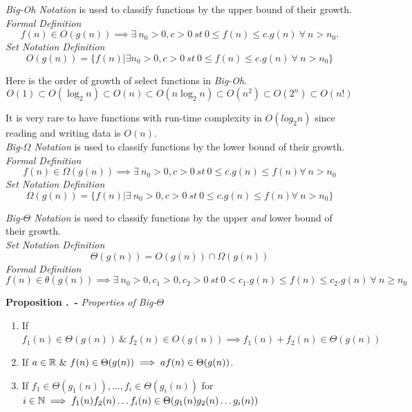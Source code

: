 \documentclass[11pt,a4paper]{article}
\begin{document}
\textit{Big-Oh Notation} is  used to classify functions by the upper bound of their growth.\\
\textit{Formal Definition}
$$f(n) \in O(g(n)) \implies \exists\ n_0 > 0, c>0\ st\ 0\leq f(n) \leq c.g(n)\ \forall\ n>n_0.$$
\textit{Set Notation Definition}
$$O(g(n))=\{f(n) | \exists n_0>0, c>0\ st\ 0\leq f(n)\leq c.g(n)\ \forall\ n>n_0\}$$

Here is the order of growth of select functions in \textit{Big-Oh}.
$$O(1) \subset O(\log_2n) \subset O(n) \subset O(n\log_2n) \subset O(n^2) \subset O(2^n) \subset O(n!)$$

It is very rare to have functions with run-time complexity in $O(log_2n)$ since reading and writing data is $O(n)$.\\

\textit{Big-$\Omega$ Notation} is used to classify functions by the lower bound of their growth.\\
\textit{Formal Definition}
$$f(n)\in\Omega(g(n)) \implies \exists\ n_0>0,c>0\ st\ 0\leq c.g(n)\leq f(n)\forall\ n>n_0$$
\textit{Set Notation Definition}
$$\Omega(g(n))=\{f(n)|\exists\ n_0>0,c>0\ st\ 0\leq c.g(n)\leq f(n)\forall\ n>n_0\}$$

\textit{Big-$\Theta$ Notation} is used to classify functions by the upper \textit{and} lower bound of their growth.\\
\textit{Set Notation Definition}
$$\Theta(g(n))=O(g(n))\cap\Omega(g(n))$$
\textit{Formal Definition}
$$f(n)\in\theta(g(n))\implies\exists\ n_0>0, c_1>0, c_2>0\ st\ 0<c_1.g(n)\leq f(n)\leq c_2.g(n)\ \forall\ n\geq n_0$$

\textbf{Proposition .\ - }\textit{Properties of Big-$\Theta$}
\begin{enumerate}[label=\roman*)]
  \item If $f_1(n)\in\Theta(g(n))\ \&\ f_2(n)\in O(g(n)) \implies f_1(n)+f_2(n) \in\Theta(g(n))$\\
  \item If $a\in\real\ \&\ f(n)\in\Theta(g(n))\implies af(n)\in\Theta(g(n))$.\\
  \item If $f_1 \in\Theta(g_1(n)), \dots, f_i\in\Theta(g_i(n))$ for $i \in\mathbb{N} \implies f_1(n)f_2(n)\dots f_i(n) \in\Theta(g_1(n)g_2(n)\dots g_i(n))$
\end{enumerate}
\end{document}

